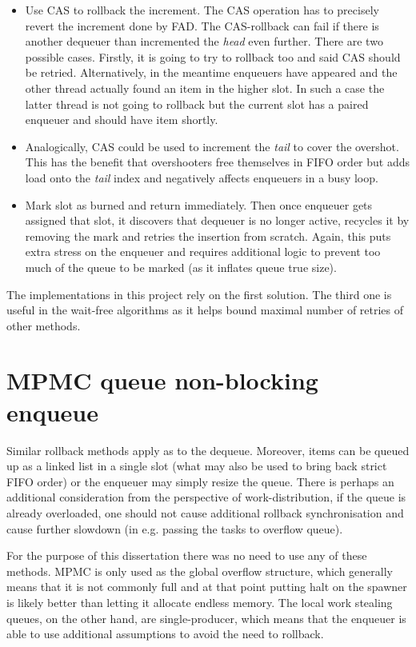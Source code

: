 \documentclass[12pt,a4paper,twoside]{report}
\begin{document}
\begin{itemize}
    \item Use CAS to rollback the increment. The CAS operation has to precisely revert the increment done by FAD. The CAS-rollback can fail if there is another dequeuer than incremented the \textit{head} even further. There are two possible cases. Firstly, it is going to try to rollback too and said CAS should be retried. Alternatively, in the meantime enqueuers have appeared and the other thread actually found an item in the higher slot. In such a case the latter thread is not going to rollback but the current slot has a paired enqueuer and should have item shortly. 
    \item Analogically, CAS could be used to increment the \textit{tail} to cover the overshot. This has the benefit that overshooters free themselves in FIFO order but adds load onto the \textit{tail} index and negatively affects enqueuers in a busy loop.
    \item Mark slot as burned and return immediately. Then once enqueuer gets assigned that slot, it discovers that dequeuer is no longer active, recycles it by removing the mark and retries the insertion from scratch. Again, this puts extra stress on the enqueuer and requires additional logic to prevent too much of the queue to be marked (as it inflates queue true size).  
\end{itemize}

The implementations in this project rely on the first solution. The third one is useful in the wait-free algorithms as it helps bound maximal number of retries of other methods. 

\section{MPMC queue non-blocking enqueue}

Similar rollback methods apply as to the dequeue. Moreover, items can be queued up as a linked list in a single slot (what may also be used to bring back strict FIFO order) or the enqueuer may simply resize the queue. There is perhaps an additional consideration from the perspective of work-distribution, if the queue is already overloaded, one should not cause additional rollback synchronisation and cause further slowdown (in e.g. passing the tasks to overflow queue). 

For the purpose of this dissertation there was no need to use any of these methods. MPMC is only used as the global overflow structure, which generally means that it is not commonly full and at that point putting halt on the spawner is likely better than letting it allocate endless memory. The local work stealing queues, on the other hand, are single-producer, which means that the enqueuer is able to use additional assumptions to avoid the need to rollback.
\end{document}
